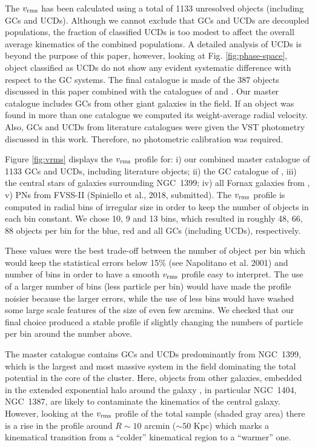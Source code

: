 \documentclass[usenatbib]{mnras}
\begin{document}
The $v_{\rm rms}$ has been calculated using a total of 1133 unresolved objects
(including GCs and UCDs). Although we cannot exclude that GCs and UCDs are
decoupled populations,
the fraction of classified UCDs is too modest to affect the overall average
kinematics of the combined populations. A detailed analysis of UCDs is beyond
the purpose of this paper,
however, looking at Fig. \ref{fig:phase-space}, object classified as UCDs do
not show any evident systematic difference with respect to the GC systems.
The final catalogue is made of the 387 objects discussed in this paper
combined with the catalogues of \citet{Bergond07} and \citet{Schuberth}. Our master catalogue
includes GCs from other giant galaxies in the field. If an
object was found in more than one catalogue we computed its weight-average radial
velocity. Also, GCs and UCDs from
literature catalogues were given the VST photometry discussed in this work.
Therefore, no photometric calibration was required.

Figure \ref{fig:vrms} displays the $v_{\rm rms}$ profile for: i) our combined master
catalogue of 1133 GCs and UCDs, including literature objects; ii) the GC catalogue of
\citet{Schuberth}, iii) the central stars of galaxies surrounding NGC~1399; iv)
all Fornax galaxies from \citet{Drinkwater00}, v) PNs from FVSS-II (Spiniello et al., 2018, submitted).
The $v_{\rm rms}$ profile is computed in radial bins of irregular
size in order to keep the number of objects in each bin constant.
We chose 10, 9 and 13 bins, which resulted in roughly 48, 66, 88 objects per
bin for the blue, red and all GCs (including UCDs), respectively. 

These values were the best trade-off between the number of object per bin 
which would keep the statistical errors below 15\% (see Napolitano et al. 2001) 
and number of bins in order to have a smooth $v_{\rm rms}$ profile easy to interpret. 
The use of a larger number of bins (less particle per bin) would have made 
the profile noisier because the larger errors, while the use of less bins would have 
washed some large scale features of the size of even few arcmins. 
We checked that our final choice produced a stable profile if slightly changing 
the numbers of particle per bin around the number above.

The master catalogue contains GCs and UCDs predominantly from NGC~1399, which
is the largest and most massive system in the field dominating the total
potential in the core of the cluster. Here, objects from other galaxies,
embedded in the extended exponential halo around the galaxy \citep{Iodice16},
in particular NGC~1404, NGC~1387, are likely to contaminate the
kinematics of the central galaxy. However, looking at the $v_{\rm rms}$
profile of the total sample (shaded gray area) there is a rise in the
profile around $R\sim10$ arcmin ($\sim 50$ Kpc) which marks a kinematical transition from a
``colder'' kinematical region to a ``warmer'' one.
\end{document}
